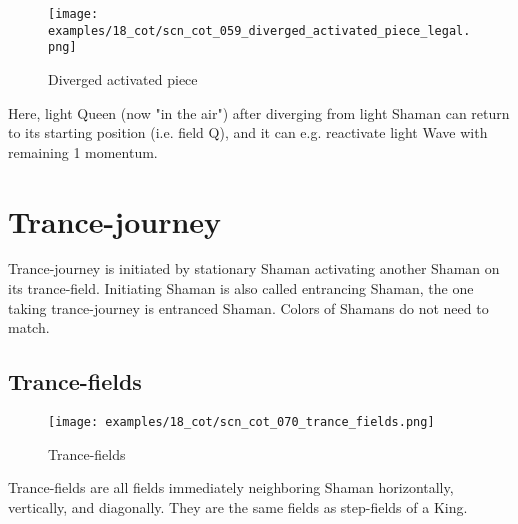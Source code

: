 \vspace*{2.9\baselineskip}
\noindent
\begin{wrapfigure}[6]{l}{0.4\textwidth}
\centering
\texttt{[image: examples/18\_cot/scn\_cot\_059\_diverged\_activated\_piece\_legal.png]}
\vspace*{-0.4\baselineskip}
\caption{Diverged activated piece}
\label{fig:scn_cot_059_diverged_activated_piece_legal}
\end{wrapfigure}
Here, light Queen (now "in the air") after diverging from light Shaman can return
to its starting position (i.e. field Q), and it can e.g. reactivate light Wave with
remaining 1 momentum.

\clearpage %

\section*{Trance-journey}
\label{sec:Conquest of Tlalocan/Trance-journey}

\vspace*{-0.7\baselineskip}
Trance-journey is initiated by stationary Shaman activating another Shaman
on its trance-field. Initiating Shaman is also called entrancing Shaman, the
one taking trance-journey is entranced Shaman.
Colors of Shamans do not need to match.

\vspace*{-0.7\baselineskip}
\subsection*{Trance-fields}
\label{sec:Conquest of Tlalocan/Trance-journey/Trance-fields}

\vspace*{-0.9\baselineskip}
\noindent
\begin{wrapfigure}[5]{l}{0.4\textwidth}
\centering
\texttt{[image: examples/18\_cot/scn\_cot\_070\_trance\_fields.png]}
\vspace*{-0.4\baselineskip}
\caption{Trance-fields}
\label{fig:scn_cot_070_trance_fields}
\end{wrapfigure}
Trance-fields are all fields immediately neighboring Shaman horizontally,
vertically, and diagonally. They are the same fields as step-fields of a King.

